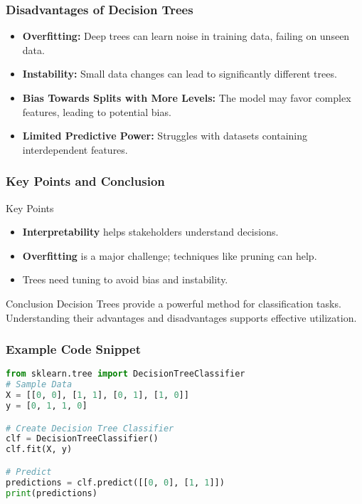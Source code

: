 \documentclass[aspectratio=169]{beamer}
\begin{document}
\begin{frame}[fragile]
    \frametitle{Disadvantages of Decision Trees}
    \begin{itemize}
        \item \textbf{Overfitting:} 
        Deep trees can learn noise in training data, failing on unseen data.
        \item \textbf{Instability:} 
        Small data changes can lead to significantly different trees.
        \item \textbf{Bias Towards Splits with More Levels:} 
        The model may favor complex features, leading to potential bias.
        \item \textbf{Limited Predictive Power:} 
        Struggles with datasets containing interdependent features.
    \end{itemize}
\end{frame}

\begin{frame}[fragile]
    \frametitle{Key Points and Conclusion}
    \begin{block}{Key Points}
        \begin{itemize}
            \item \textbf{Interpretability} helps stakeholders understand decisions.
            \item \textbf{Overfitting} is a major challenge; techniques like pruning can help.
            \item Trees need tuning to avoid bias and instability.
        \end{itemize}
    \end{block}
    \begin{block}{Conclusion}
        Decision Trees provide a powerful method for classification tasks. Understanding their advantages and disadvantages supports effective utilization.
    \end{block}
\end{frame}

\begin{frame}[fragile]
    \frametitle{Example Code Snippet}
    \begin{lstlisting}[language=Python]
from sklearn.tree import DecisionTreeClassifier
# Sample Data
X = [[0, 0], [1, 1], [0, 1], [1, 0]]
y = [0, 1, 1, 0]

# Create Decision Tree Classifier
clf = DecisionTreeClassifier()
clf.fit(X, y)

# Predict
predictions = clf.predict([[0, 0], [1, 1]])
print(predictions)
    \end{lstlisting}
\end{frame}
\end{document}
